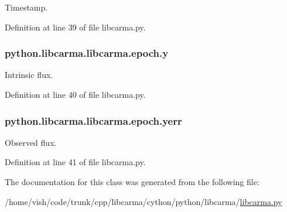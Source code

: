 Timestamp. 



Definition at line 39 of file libcarma.\-py.

\hypertarget{classpython_1_1libcarma_1_1libcarma_1_1epoch_a61f3231c84360ba42ed61c0fb8952262}{
\subsubsection[{y}]{\setlength{\rightskip}{0pt plus 5cm}python.\-libcarma.\-libcarma.\-epoch.\-y}}\label{classpython_1_1libcarma_1_1libcarma_1_1epoch_a61f3231c84360ba42ed61c0fb8952262}


Intrinsic flux. 



Definition at line 40 of file libcarma.\-py.

\hypertarget{classpython_1_1libcarma_1_1libcarma_1_1epoch_a5938ef62a82d0261aad38ddb182e0b9a}{
\subsubsection[{yerr}]{\setlength{\rightskip}{0pt plus 5cm}python.\-libcarma.\-libcarma.\-epoch.\-yerr}}\label{classpython_1_1libcarma_1_1libcarma_1_1epoch_a5938ef62a82d0261aad38ddb182e0b9a}


Observed flux. 



Definition at line 41 of file libcarma.\-py.



The documentation for this class was generated from the following file\-:\begin{DoxyCompactItemize}
\item 
/home/vish/code/trunk/cpp/libcarma/cython/python/libcarma/\hyperlink{libcarma_8py}{libcarma.\-py}\end{DoxyCompactItemize}
